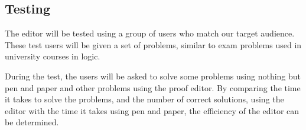 \subsection{Testing}
The editor will be tested using a group of users who match our target audience. These test users will be given a set of problems, similar to exam problems used in university courses in logic.

During the test, the users will be asked to solve some problems using nothing
but pen and paper and other problems using the proof editor. By comparing the
time it takes to solve the problems, and the number of correct solutions,  using the editor with the time it takes using pen and paper, the efficiency of the editor can be determined.